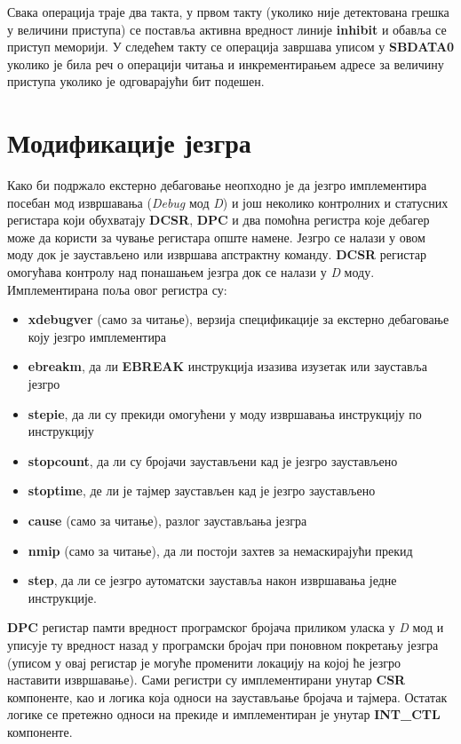 Свака операција траје два такта, у првом такту (уколико није детектована грешка у величини приступа) се поставља активна вредност линије \textbf{inhibit} и обавља се приступ меморији.
У следећем такту се операција завршава уписом у \textbf{\acrshort{SBDATA}0} уколико је била реч о операцији читања и инкрементирањем адресе за величину приступа уколико је одговарајући бит подешен.

\section{Модификације језгра}

Како би подржало екстерно дебаговање неопходно је да језгро имплементира посебан мод извршавања (\textit{Debug} мод \textit{D}) и још неколико контролних и статусних регистара који обухватају \textbf{\acrshort{DCSR}}, \textbf{\acrshort{DPC}} и два помоћна регистра које дебагер може да користи за чување регистара опште намене. Језгро се налази у овом моду док је заустављено или извршава апстрактну команду. \textbf{\acrshort{DCSR}} регистар омогућава контролу над понашањем језгра док се налази у \textit{D} моду. Имплементирана поља овог регистра су:
\begin{itemize}
	\item \textbf{xdebugver} (само за читање), верзија спецификације за екстерно дебаговање коју језгро имплементира
	\item \textbf{ebreakm}, да ли \textbf{EBREAK} инструкција изазива изузетак или зауставља језгро
	\item \textbf{stepie}, да ли су прекиди омогућени у моду извршавања инструкцију по инструкцију
	\item \textbf{stopcount}, да ли су бројачи заустављени кад је језгро заустављено
	\item \textbf{stoptime}, де ли је тајмер заустављен кад је језгро заустављено
	\item \textbf{cause} (само за читање), разлог заустављања језгра
	\item \textbf{nmip} (само за читање), да ли постоји захтев за немаскирајући прекид
	\item \textbf{step}, да ли се језгро аутоматски зауставља након извршавања једне инструкције.
\end{itemize}
\textbf{\acrshort{DPC}} регистар памти вредност програмског бројача приликом уласка у \textit{D} мод и уписује ту вредност назад у програмски бројач при поновном покретању језгра (уписом у овај регистар је могуће променити локацију на којој ће језгро наставити извршавање). Сами регистри су имплементирани унутар \textbf{CSR} компоненте, као и логика која односи на заустављање бројача и тајмера. Остатак логике се претежно односи на прекиде и имплементиран је унутар \textbf{INT\_CTL} компоненте.

